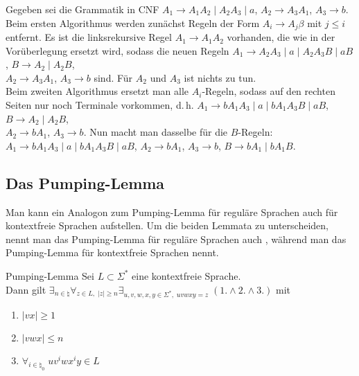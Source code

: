 \linie

\begin{Bsp}
    Gegeben sei die Grammatik in CNF
    $A_1 \rightarrow A_1 A_2 \;|\; A_2 A_3 \;|\; a$,\quad
    $A_2 \rightarrow A_3 A_1$,\quad
    $A_3 \rightarrow b$.\\
    Beim ersten Algorithmus werden zunächst Regeln der Form
    $A_i \rightarrow A_j \beta$ mit $j \le i$ entfernt.
    Es ist die linksrekursive Regel $A_1 \rightarrow A_1 A_2$ vorhanden,
    die wie in der Vorüberlegung ersetzt wird, sodass die neuen Regeln
    $A_1 \rightarrow A_2 A_3 \;|\; a \;|\; A_2 A_3 B \;|\; a B$,\quad
    $B \rightarrow A_2 \;|\; A_2 B$,\\
    $A_2 \rightarrow A_3 A_1$,\quad
    $A_3 \rightarrow b$ sind.
    Für $A_2$ und $A_3$ ist nichts zu tun.\\
    Beim zweiten Algorithmus ersetzt man alle $A_i$-Regeln, sodass auf den
    rechten Seiten nur noch Terminale vorkommen, d.\,h.
    $A_1 \rightarrow b A_1 A_3 \;|\; a \;|\; b A_1 A_3 B \;|\; a B$,\quad
    $B \rightarrow A_2 \;|\; A_2 B$,\\
    $A_2 \rightarrow b A_1$,\quad
    $A_3 \rightarrow b$.
    Nun macht man dasselbe für die $B$-Regeln:\\
    $A_1 \rightarrow b A_1 A_3 \;|\; a \;|\; b A_1 A_3 B \;|\; a B$,\qquad
    $A_2 \rightarrow b A_1$,\qquad
    $A_3 \rightarrow b$,\qquad
    $B \rightarrow b A_1 \;|\; b A_1 B$.
\end{Bsp}

\pagebreak

\subsection{%
    Das Pumping-Lemma%
}

\begin{Bem}
    Man kann ein Analogon zum Pumping-Lemma für reguläre Sprachen auch für
    kontextfreie Sprachen aufstellen.
    Um die beiden Lemmata zu unterscheiden, nennt man das Pumping-Lemma für
    reguläre Sprachen auch , während man das
    Pumping-Lemma für kontextfreie Sprachen  nennt.
\end{Bem}

\begin{Satz}{Pumping-Lemma}
    Sei $L \subset \Sigma^\ast$ eine kontextfreie Sprache.\\
    Dann gilt
    $\exists_{n \in \natural} \forall_{z \in L,\; |z| \ge n}
    \exists_{u, v, w, x, y \in \Sigma^\ast,\; uvwxy = z}\;
    (1. \land 2. \land 3.)$ mit
    \begin{enumerate}
        \item
        $|vx| \ge 1$

        \item
        $|vwx| \le n$

        \item
        $\forall_{i \in \natural_0}\; u v^i w x^i y \in L$
    \end{enumerate}
\end{Satz}

